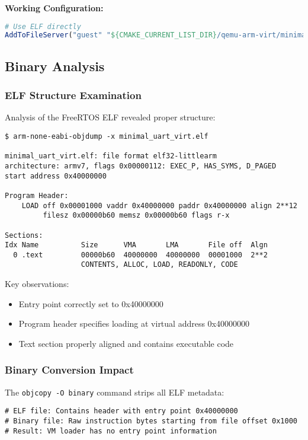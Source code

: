 \documentclass[11pt,a4paper]{article}
\begin{document}
\textbf{Working Configuration:}
\begin{lstlisting}[language=cmake, caption=Direct ELF Loading]
# Use ELF directly
AddToFileServer("guest" "${CMAKE_CURRENT_LIST_DIR}/qemu-arm-virt/minimal_uart_virt.elf")
\end{lstlisting}

\subsection{Binary Analysis}

\subsubsection{ELF Structure Examination}

Analysis of the FreeRTOS ELF revealed proper structure:

\begin{lstlisting}[caption=objdump Analysis of FreeRTOS ELF]
$ arm-none-eabi-objdump -x minimal_uart_virt.elf

minimal_uart_virt.elf: file format elf32-littlearm
architecture: armv7, flags 0x00000112: EXEC_P, HAS_SYMS, D_PAGED
start address 0x40000000

Program Header:
    LOAD off 0x00001000 vaddr 0x40000000 paddr 0x40000000 align 2**12
         filesz 0x00000b60 memsz 0x00000b60 flags r-x

Sections:
Idx Name          Size      VMA       LMA       File off  Algn
  0 .text         00000b60  40000000  40000000  00001000  2**2
                  CONTENTS, ALLOC, LOAD, READONLY, CODE
\end{lstlisting}

Key observations:
\begin{itemize}
\item Entry point correctly set to 0x40000000
\item Program header specifies loading at virtual address 0x40000000
\item Text section properly aligned and contains executable code
\end{itemize}

\subsubsection{Binary Conversion Impact}

The \texttt{objcopy -O binary} command strips all ELF metadata:

\begin{lstlisting}[caption=Binary Conversion Effects]
# ELF file: Contains header with entry point 0x40000000
# Binary file: Raw instruction bytes starting from file offset 0x1000
# Result: VM loader has no entry point information
\end{lstlisting}
\end{document}
